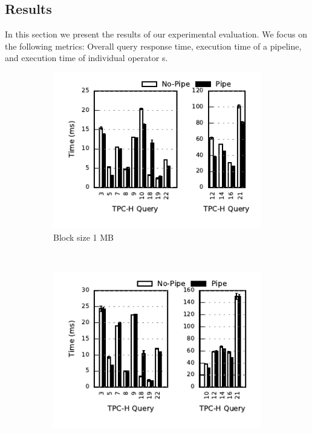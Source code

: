 \subsection{Results}
In this section we present the results of our experimental evaluation. 
We focus on the following metrics: Overall query response time, execution time of a pipeline, and execution time of individual operator \wo{}s.

\begin{figure}[t]
	\centering
	\begin{subfigure}[ht]{0.32\textwidth}
		\includegraphics[width=\textwidth]{pipeline/figures/first-consumer-comparison-1mb-withlip}	
		\caption{Block size 1 MB}
	\end{subfigure}
	~
	\begin{subfigure}[ht]{0.32\textwidth}
		\includegraphics[width=\textwidth]{pipeline/figures/first-consumer-comparison-2mb-withlip}	

\end{subfigure}
\end{figure}
